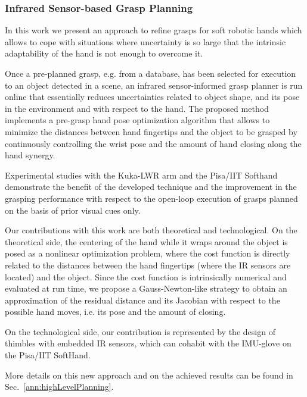 
\subsubsection{Infrared Sensor-based Grasp Planning}
\label{sec:IRSensorBasedGraspPlanning}

In this work we present an approach to refine grasps for soft robotic hands which allows to cope with situations where uncertainty is so large that the intrinsic adaptability of the hand is not enough to overcome it. 

Once a pre-planned grasp, e.g. from a database, has been selected for execution to an object detected in a scene, an infrared sensor-informed grasp planner is run online that essentially reduces uncertainties related to object shape, and its pose in the environment and with respect to the hand. The proposed method implements a pre-grasp hand pose optimization algorithm
that allows to minimize the distances between hand fingertips and the object to be grasped by continuously controlling the wrist pose and the amount of hand closing along the hand synergy. 

Experimental studies with the Kuka-LWR arm and the Pisa/IIT Softhand demonstrate the benefit of the developed technique and the improvement in the grasping performance with respect to the open-loop execution of grasps planned on the basis of prior visual cues only.

Our contributions with this work are both theoretical and technological. On the theoretical side, the centering of the hand while it wraps around the object is posed as a nonlinear optimization problem, where the cost function is directly related to the distances between the hand fingertips (where the IR sensors are located) and the object. Since the cost function is intrinsically numerical and evaluated at run time, we propose a Gauss-Newton-like strategy to obtain an approximation of the residual distance and its Jacobian with respect to the possible hand moves, i.e. its pose and the amount of closing.

On the technological side, our contribution is represented by the design of thimbles with embedded IR sensors, which can cohabit with the IMU-glove on the Pisa/IIT SoftHand. 

More details on this new approach and on the achieved results can be found in Sec.~\ref{ann:highLevelPlanning}.
